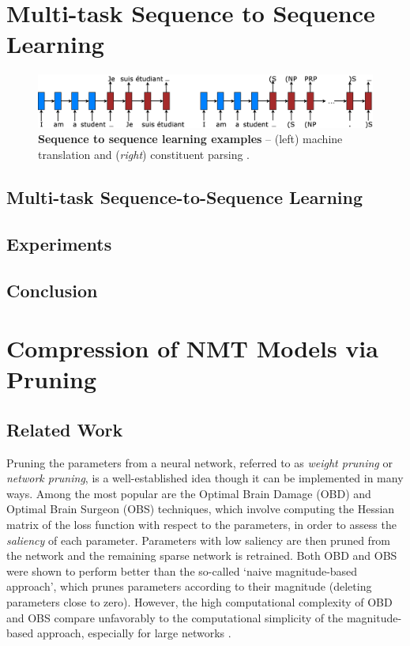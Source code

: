 
\section{Multi-task Sequence to Sequence Learning}

\begin{figure}%
\centering
\includegraphics[width=1\textwidth, clip=true, trim= 0 0 0
0]{img/6-1_seq2seq}
\caption{{\bf Sequence to sequence learning examples} -- (left) machine
translation \citep{sutskever14} and ({\it right}) constituent parsing
\citep{vinyals15grammar}.}
\label{f:s2s}
\end{figure}


\subsection{Multi-task Sequence-to-Sequence Learning}
\label{subsec:multi}


\subsection{Experiments}
\label{sec:exp}


\subsection{Conclusion}
\label{sec:conclude}


\section{Compression of NMT Models via Pruning}


\subsection{Related Work}
\label{subsec:related}
Pruning the parameters from a neural network, referred to as \textit{weight pruning} or \textit{network pruning}, is a well-established idea though it can be implemented in many ways. 
Among the most popular are the Optimal Brain Damage (OBD)
\cite{lecun1989optimal} and Optimal Brain Surgeon (OBS) \cite{hassibi1993second} techniques, which involve computing the Hessian matrix of the loss function with respect to the parameters, in order to assess the \textit{saliency} of each parameter. 
Parameters with low saliency are then pruned from the network and the remaining sparse network is retrained. 
Both OBD and OBS were shown to perform better than the so-called `naive magnitude-based approach', which prunes parameters according to their magnitude (deleting parameters close to zero).
However, the high computational complexity of OBD and OBS compare unfavorably to the computational simplicity of the magnitude-based approach, especially for large networks \cite{augasta2013pruning}.

